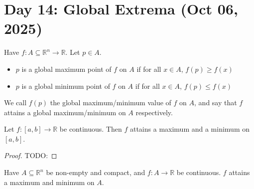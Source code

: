 \section{Day 14: Global Extrema (Oct 06, 2025)}

\begin{definition}
    Have $f : A \subseteq \mathbb{R}^n \to \mathbb{R}$. Let $p \in A$.
    \begin{itemize}
        \item $p$ is a global maximum point of $f$ on $A$ if for all $x \in A$, $f(p) \geq f(x)$ 
        \item $p$ is a global minimum point of $f$ on $A$ if for all $x \in A$, $f(p) \leq f(x)$
    \end{itemize}
    We call $f(p)$ the global maximum/minimum value of $f$ on $A$, and say that $f$ attains a global maximum/minimum on $A$ respectively. 
\end{definition}

\begin{simplethm}
    Let $f : [a, b] \to \mathbb{R}$ be continuous. Then $f$ attains a maximum and a minimum on $[a, b]$. 
\end{simplethm}

\begin{proof}
    TODO:
\end{proof}

\begin{simplethm}[EVT]
    Have $A \subseteq \mathbb{R}^n$ be non-empty and compact, and $f : A \to \mathbb{R}$ be continuous. $f$ attains a maximum and minimum on $A$. 
\end{simplethm}
